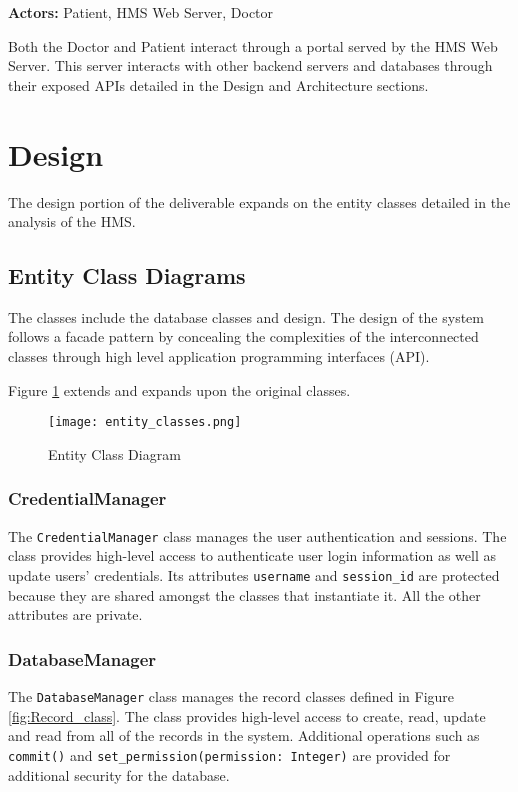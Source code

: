 \documentclass[a4paper, 11pt]{article}
\begin{document}
\noindent \textbf{Actors:} Patient, HMS Web Server, Doctor
\vspace{4mm}

Both the Doctor and Patient interact through a portal served by the HMS Web Server. This server interacts with other backend servers and databases through their exposed APIs detailed in the Design and Architecture sections.

\section{Design}

The design portion of the deliverable expands on the entity classes detailed in the analysis of the HMS.

\subsection{Entity Class Diagrams}
The classes include the database classes and design. The design of the system follows a facade pattern by concealing the complexities of the interconnected classes through high level application programming interfaces (API).

Figure \ref{fig:entity_classes} extends and expands upon the original classes.

\begin{figure}[!htb]
    \centering
    \texttt{[image: entity\_classes.png]}
    \caption{Entity Class Diagram}
    \label{fig:entity_classes}
\end{figure}
\subsubsection{CredentialManager}
The \texttt{CredentialManager} class manages the user authentication and sessions. The class provides high-level access to authenticate user login information as well as update users' credentials. Its attributes \texttt{username} and \texttt{session\_id} are protected because they are shared amongst the classes that instantiate it. All the other attributes are private.

\subsubsection{DatabaseManager}
The \texttt{DatabaseManager} class manages the record classes defined in Figure \ref{fig:Record_class}. The class provides high-level access to create, read, update and read from all of the records in the system. Additional operations such as \texttt{commit()} and \texttt{set\_permission(permission: Integer)} are provided for additional security for the database.
\end{document}
